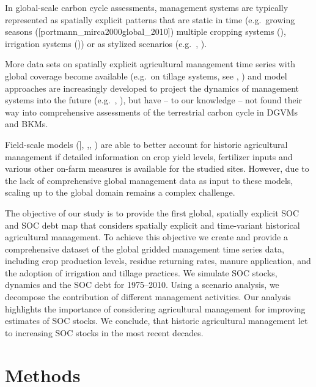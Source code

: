 \documentclass[gc, manuscript]{copernicus}
\begin{document}
In global-scale carbon cycle assessments, management systems are typically represented as spatially explicit patterns that are static in time (e.g.~growing seasons ({[}portmann\_mirca2000global\_2010{]}) multiple cropping systems (\citep{waha_multiple_2020}), irrigation systems (\citep{jagermeyr_water_2015})) or as stylized scenarios (e.g.~\citep{pugh_simulated_2015}, \citep{lutz_simulating_2019}).

More data sets on spatially explicit agricultural management time series with global coverage become available (e.g.~on tillage systems, see \citep{porwollik_generating_2018}, \citep{prestele_spatially_2018}) and model approaches are increasingly developed to project the dynamics of management systems into the future (e.g.~\citep{iizumi_modeling_2019}, \citep{minoli_modelling_2019}), but have -- to our knowledge -- not found their way into comprehensive assessments of the terrestrial carbon cycle in DGVMs and BKMs.

Field-scale models (\citet{del_grosso_simulated_2001}{]}, \citep{coleman_simulating_1997},\citep{smith_estimating_2010}, \citep{taghizadeh-toosi_c-tool_2014}) are able to better account for historic agricultural management if detailed information on crop yield levels, fertilizer inputs and various other on-farm measures is available for the studied sites. However, due to the lack of comprehensive global management data as input to these models, scaling up to the global domain remains a complex challenge.

The objective of our study is to provide the first global, spatially explicit SOC and SOC debt map that considers spatially explicit and time-variant historical agricultural management. To achieve this objective we create and provide a comprehensive dataset of the global gridded management time series data, including crop production levels, residue returning rates, manure application, and the adoption of irrigation and tillage practices. We simulate SOC stocks, dynamics and the SOC debt for 1975--2010. Using a scenario analysis, we decompose the contribution of different management activities. Our analysis highlights the importance of considering agricultural management for improving estimates of SOC stocks. We conclude, that historic agricultural management let to increasing SOC stocks in the most recent decades.
\newpage

\hypertarget{methods}{%
\section{Methods}\label{methods}}
\end{document}
